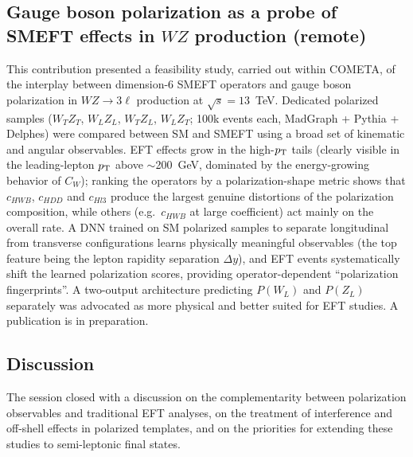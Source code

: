 \subsection{Gauge boson polarization as a probe of SMEFT effects in $WZ$ production (remote)}
This contribution presented a feasibility study, carried out within COMETA, of
the interplay between dimension-6 SMEFT operators and gauge boson polarization
in $WZ\to 3\ell$ production at $\sqrt{s}=13$~TeV. Dedicated polarized samples
($W_TZ_T$, $W_LZ_L$, $W_TZ_L$, $W_LZ_T$; 100k events each, MadGraph + Pythia +
Delphes) were compared between SM and SMEFT using a broad set of kinematic and
angular observables. EFT effects grow in the high-$p_{\mathrm{T}}$ tails (clearly visible
in the leading-lepton $p_{\mathrm{T}}$ above $\sim$200~GeV, dominated by the
energy-growing behavior of $C_W$); ranking the operators by a
polarization-shape metric shows that $c_{HWB}$, $c_{HDD}$ and $c_{Hl3}$ produce
the largest genuine distortions of the polarization composition, while others
(e.g.\ $c_{HWB}$ at large coefficient) act mainly on the overall rate. A DNN
trained on SM polarized samples to separate longitudinal from transverse
configurations learns physically meaningful observables (the top feature being
the lepton rapidity separation $\Delta y$), and EFT events systematically shift
the learned polarization scores, providing operator-dependent ``polarization
fingerprints''. A two-output architecture predicting $P(W_L)$ and $P(Z_L)$
separately was advocated as more physical and better suited for EFT studies. A
publication is in preparation.

\subsection{Discussion}
The session closed with a discussion on the complementarity between
polarization observables and traditional EFT analyses, on the treatment of
interference and off-shell effects in polarized templates, and on the
priorities for extending these studies to semi-leptonic final states.
